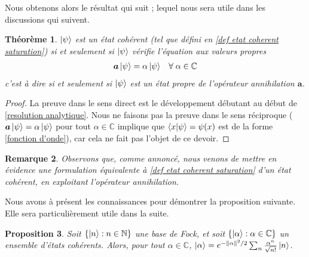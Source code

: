 \documentclass[11pt,oneside,a4paper]{article}
\newtheorem{theorem}{Théorème}[section]
\newtheorem{property}[theorem]{Proposition}
\newtheorem{remark}[theorem]{Remarque}
\begin{document}
Nous obtenons alors le résultat qui suit ; lequel nous sera utile dans les discussions qui suivent. 
\begin{theorem}
  $\ket{\psi}$ est un état cohérent (tel que défini en \ref{def etat coherent saturation}) si et seulement si $\ket{\psi}$ vérifie l'équation aux valeurs propres
  \begin{align}
    \label{etat coherent}
    \bm{a}\ket{\psi} &= \alpha\ket{\psi} &\forall\; \alpha\in\mathbb{C}
  \end{align}
  c'est à dire si et seulement si $\ket{\psi}$ est un état propre de l'opérateur annihilation $\bm{a}$.
\end{theorem}

\begin{proof}
  La preuve dans le sens direct est le développement débutant au début de \ref{resolution analytique}. Nous ne faisons pas la preuve dans le sens réciproque ($\bm{a}\ket{\psi}=\alpha\ket{\psi}$ pour tout $\alpha\in\mathbb{C}$ implique que $\braket{x}{\psi}=\psi(x)$ est de la forme \ref{fonction d'onde}), car cela ne fait pas l'objet de ce devoir.
\end{proof}

\begin{remark}
  Observons que, comme annoncé, nous venons de mettre en évidence une formulation équivalente à \ref{def etat coherent saturation} d'un état cohérent, en exploitant l'opérateur annihilation.
\end{remark}

Nous avons à présent les connaissances pour démontrer la proposition suivante. Elle sera particulièrement utile dans la suite.

\begin{property}
  \label{coherent in fock}
  Soit $\left\{\ket{n} : n\in\mathbb{N}\right\}$ une base de Fock, et soit $\left\{\ket{\alpha} : \alpha\in\mathbb{C}\right\}$ un ensemble d'états cohérents. Alors, pour tout $\alpha\in\mathbb{C}$, $\ket{\alpha} = e^{-\norm{\alpha}^2/2}\sum_n \frac{\alpha^n}{\sqrt{n!}}\ket{n}$.
\end{property}
\end{document}
